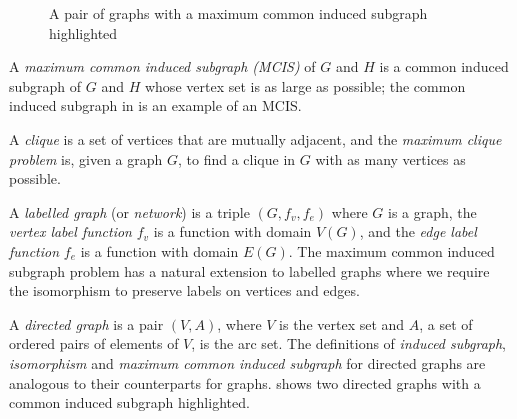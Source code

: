 \begin{figure}[h!]
\centering
{}
\qquad
{}
\caption{A pair of graphs with a maximum common induced subgraph highlighted}
\label{fig:cis-example}
\end{figure}

A \emph{maximum common induced subgraph (MCIS)} of $G$ and $H$ is a common
induced subgraph of $G$ and $H$ whose vertex set is as large as possible; the
common induced subgraph in  is an example of an MCIS.

A \emph{clique} is a set of vertices that are mutually adjacent, and the
\emph{maximum clique problem} is, given a graph $G$, to find a clique in $G$
with as many vertices as possible.

A \emph{labelled graph} (or \emph{network}) is a triple $(G, f_v, f_e)$
where $G$ is a graph,
the \emph{vertex label function} $f_v$ is a function with domain $V(G)$,
and the \emph{edge label function} $f_e$ is a function with domain $E(G)$.
The maximum common induced subgraph problem has a natural extension to labelled graphs
where we require the isomorphism to preserve labels on vertices and edges.

A \emph{directed graph} is a pair $(V,A)$, where $V$ is the vertex set and $A$,
a set of ordered pairs of elements of $V$, is the arc set.  The definitions of
\emph{induced subgraph}, \emph{isomorphism} and \emph{maximum common induced
subgraph} for directed graphs are analogous to their counterparts for graphs.
\label{fig:directed-cis-example} shows two directed graphs with a common
induced subgraph highlighted.


